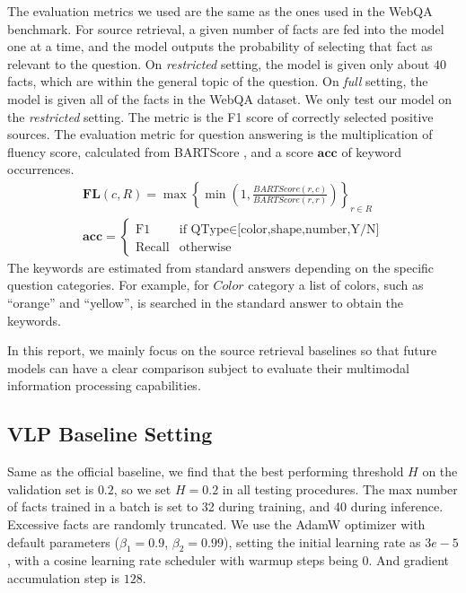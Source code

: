 \documentclass[nohyperref]{article}
\theoremstyle{plain}
\theoremstyle{definition}
\theoremstyle{remark}
\begin{document}
The evaluation metrics we used are the same as the ones used in the WebQA benchmark.
For source retrieval, a given number of facts are fed into the model one at a time, and the model outputs the probability of selecting that fact as relevant to the question.
On \textit{restricted} setting, the model is given only about $40$ facts, which are within the general topic of the question. On \textit{full} setting, the model is given all of the facts in the WebQA dataset.
We only test our model on the \textit{restricted} setting.
The metric is the F1 score of correctly selected positive sources.
The evaluation metric for question answering is the multiplication of fluency score, calculated from BARTScore \cite{bartscore}, and a score $\mathbf{acc}$ of keyword occurrences.
\begin{gather*}
    \textbf{FL}(c,R)=\max\left\{\min\left(1,\frac{BARTScore(r,c)}{BARTScore(r,r)}\right)\right\}_{r\in R} \\
    \textbf{acc} = 
    \begin{cases}
    \text{F1} & \text{if QType}\in\text{[color,shape,number,Y/N]}\\
    \text{Recall} & \text{otherwise}
    \end{cases}
\end{gather*}
The keywords are estimated from standard answers depending on the specific question categories. For example, for $\mathit{Color}$ category a list of colors, such as ``orange'' and ``yellow'', is searched in the standard answer to obtain the keywords.

In this report, we mainly focus on the source retrieval baselines so that future models can have a clear comparison subject to evaluate their multimodal information processing capabilities.

\subsection{VLP Baseline Setting}

Same as the official baseline, we find that the best performing threshold $H$ on the validation set is $0.2$, so we set $H = 0.2$ in all testing procedures.
The max number of facts trained in a batch is set to 32 during training, and 40 during inference.
Excessive facts are randomly truncated.
We use the AdamW \citep{adamw} optimizer with default parameters ($\beta_1 = 0.9$, $\beta_2= 0.99$), setting the initial learning rate as $3e-5$, with a cosine learning rate scheduler with warmup steps being 0. And gradient accumulation step is $128$.
\end{document}

